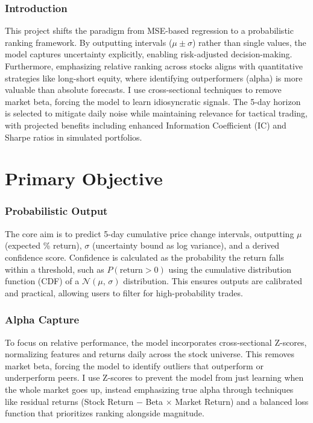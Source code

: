 \documentclass[twoside,final]{hcmut-report}
\begin{document}
\subsubsection*{Introduction}
This project shifts the paradigm from MSE-based regression to a probabilistic ranking framework. By outputting intervals (\(\mu \pm \sigma\)) rather than single values, the model captures uncertainty explicitly, enabling risk-adjusted decision-making. Furthermore, emphasizing relative ranking across stocks aligns with quantitative strategies like long-short equity, where identifying outperformers (alpha) is more valuable than absolute forecasts. I use cross-sectional techniques to remove market beta, forcing the model to learn idiosyncratic signals. The 5-day horizon is selected to mitigate daily noise while maintaining relevance for tactical trading, with projected benefits including enhanced Information Coefficient (IC) and Sharpe ratios in simulated portfolios.

\section*{Primary Objective}
\subsubsection*{Probabilistic Output}
The core aim is to predict 5-day cumulative price change intervals, outputting $\mu$ (expected \% return), $\sigma$ (uncertainty bound as log variance), and a derived confidence score. Confidence is calculated as the probability the return falls within a threshold, such as $P(\text{return} > 0)$ using the cumulative distribution function (CDF) of a $\mathcal{N}(\mu,\,\sigma)$ distribution. This ensures outputs are calibrated and practical, allowing users to filter for high-probability trades.

\subsubsection*{Alpha Capture}
To focus on relative performance, the model incorporates cross-sectional Z-scores, normalizing features and returns daily across the stock universe. This removes market beta, forcing the model to identify outliers that outperform or underperform peers. I use Z-scores to prevent the model from just learning when the whole market goes up, instead emphasizing true alpha through techniques like residual returns (Stock Return $-$ Beta $\times$ Market Return) and a balanced loss function that prioritizes ranking alongside magnitude.
\end{document}

